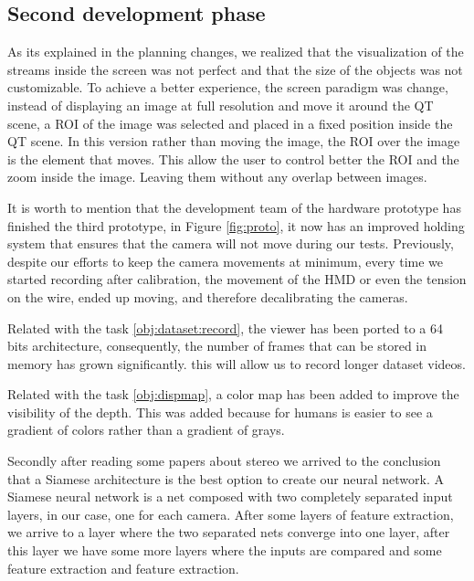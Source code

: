 \documentclass[10pt,a4paper,twocolumn,twoside]{article}
\begin{document}
	\subsection{Second development phase}
	
	As its explained in the planning changes, we realized that the visualization of the streams inside the screen was not perfect and that the size of the objects was not customizable. To achieve a better experience, the screen paradigm was change, instead of displaying an image at full resolution and move it around the QT scene, a ROI of the image was selected and placed in a fixed position inside the QT scene. In this version rather than moving the image, the ROI over the image is the element that moves. This allow the user to control better the ROI and the zoom inside the image. Leaving them without any overlap between images.  

	It is worth to mention that the development team of the hardware prototype has finished the third prototype, in Figure \ref{fig:proto}, it now has an improved holding system that ensures that the camera will not move during our tests. Previously, despite our efforts to keep the camera movements at minimum, every time we started recording after calibration, the movement of the HMD or even the tension on the wire, ended up moving, and therefore decalibrating the cameras.   
	
	Related with the task \ref{obj:dataset:record}, the viewer has been ported to a 64 bits architecture, consequently, the number of frames that can be stored in memory has grown significantly. this will allow us to record longer dataset videos.
	
	Related with the task \ref{obj:dispmap}, a color map has been added to improve the visibility of the depth. This was added  because for humans is easier to see a gradient of colors rather than a gradient of grays.  
	
	Secondly after reading some papers about stereo we arrived to the conclusion that a Siamese architecture is the best option to create our neural network. A Siamese neural network is a net composed with two completely separated input layers, in our case, one for each camera. After some layers of feature extraction, we arrive to a layer where the two separated nets converge into one layer, after this layer we have some more layers where the inputs are compared and some feature extraction and feature extraction.
	
\end{document}
